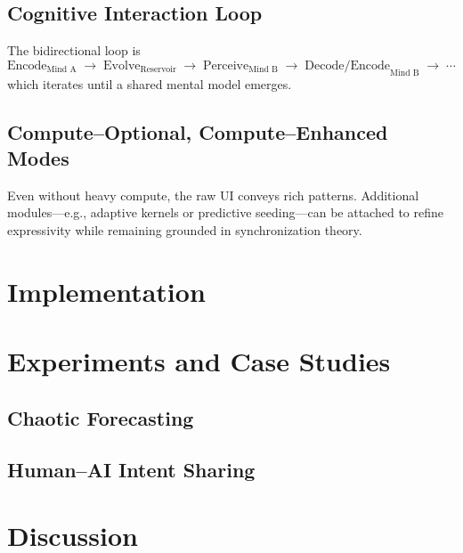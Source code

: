 \documentclass[11pt]{article}
\begin{document}
\subsection{Cognitive Interaction Loop}
The bidirectional loop is
\begin{equation*}
    \text{Encode}_{\text{Mind A}}\;\rightarrow\;\text{Evolve}_{\text{Reservoir}}\;\rightarrow\;\text{Perceive}_{\text{Mind B}}\;\rightarrow\;\text{Decode/Encode}_{\text{Mind B}}\;\rightarrow\;\cdots
\end{equation*}
which iterates until a shared mental model emerges.

\subsection{Compute–Optional, Compute–Enhanced Modes}
Even without heavy compute, the raw UI conveys rich patterns. Additional modules—e.g., adaptive kernels or predictive seeding—can be attached to refine expressivity while remaining grounded in synchronization theory.

\section{Implementation}\label{sec:implementation}

\section{Experiments and Case Studies}\label{sec:experiments}
\subsection{Chaotic Forecasting}

\subsection{Human–AI Intent Sharing}

\section{Discussion}\label{sec:discussion}
\end{document}
